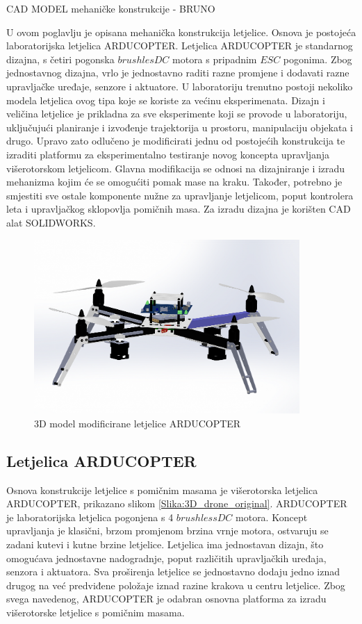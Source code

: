 \documentclass[11pt,a4paper]{article}
\begin{document}
CAD MODEL mehaničke konstrukcije - BRUNO

U ovom poglavlju je opisana mehanička konstrukcija letjelice. Osnova je postojeća laboratorijska letjelica ARDUCOPTER. Letjelica ARDUCOPTER je standarnog dizajna, s četiri pogonska $brushles DC$ motora s pripadnim $ESC$ pogonima. Zbog jednostavnog dizajna, vrlo je jednostavno raditi razne promjene i dodavati razne upravljačke uređaje, senzore i aktuatore. U laboratoriju trenutno postoji nekoliko modela letjelica ovog tipa koje se koriste za većinu eksperimenata. Dizajn i veličina letjelice je prikladna za sve eksperimente koji se provode u laboratoriju, uključujući planiranje i izvođenje trajektorija u prostoru, manipulaciju objekata i drugo. Upravo zato odlučeno je modificirati jednu od postojećih konstrukcija te izraditi platformu za eksperimentalno testiranje novog koncepta upravljanja višerotorskom letjelicom. Glavna modifikacija se odnosi na dizajniranje i izradu mehanizma kojim će se omogućiti pomak mase na kraku. Također, potrebno je smjestiti sve ostale komponente nužne za upravljanje letjelicom, poput kontrolera leta i upravljačkog sklopovlja pomičnih masa. Za izradu dizajna je korišten CAD alat SOLIDWORKS.

\begin{figure}[H]
	\centering
	\includegraphics[width=0.9\textwidth]{figures/arducopter_with_PCB.png}
	\caption{3D model modificirane letjelice ARDUCOPTER}
	\label{Slika:3D_drone_final}
\end{figure}

\subsection{Letjelica ARDUCOPTER}

Osnova konstrukcije letjelice s pomičnim masama je višerotorska letjelica ARDUCOPTER, prikazano slikom \ref{Slika:3D_drone_original}. ARDUCOPTER je laboratorijska letjelica pogonjena s 4 $brushless DC$ motora. Koncept upravljanja je klasični, brzom promjenom brzina vrnje motora, ostvaruju se zadani kutevi i kutne brzine letjelice. Letjelica ima jednostavan dizajn, što omogućava jednostavne nadogradnje, poput različitih upravljačkih uređaja, senzora i aktuatora. Sva proširenja letjelice se jednostavno dodaju jedno iznad drugog na već predviđene položaje iznad razine krakova u centru letjelice. Zbog svega navedenog, ARDUCOPTER je odabran osnovna platforma za izradu višerotorske letjelice s pomičnim masama.
\end{document}
